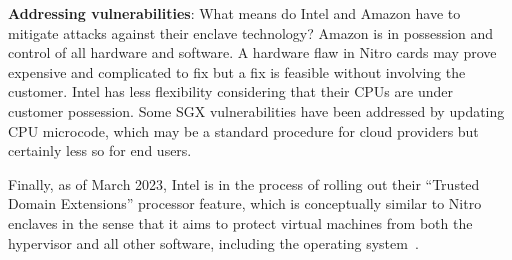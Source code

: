 \textbf{Addressing vulnerabilities}:
What means do Intel and Amazon have to mitigate attacks against their enclave
technology?  Amazon is in possession and control of all hardware and software.
A hardware flaw in Nitro cards may prove expensive and complicated to fix but a
fix is feasible without involving the customer.  Intel has less flexibility
considering that their CPUs are under customer possession.  Some SGX
vulnerabilities have been addressed by updating CPU microcode, which may be a
standard procedure for cloud providers but certainly less so for end users.

Finally, as of March 2023, Intel is in the process of rolling out their
``Trusted Domain Extensions'' processor feature, which is conceptually similar
to Nitro enclaves in the sense that it aims to protect virtual machines from
both the hypervisor and all other software, including the operating
system~\cite{tdx}.
